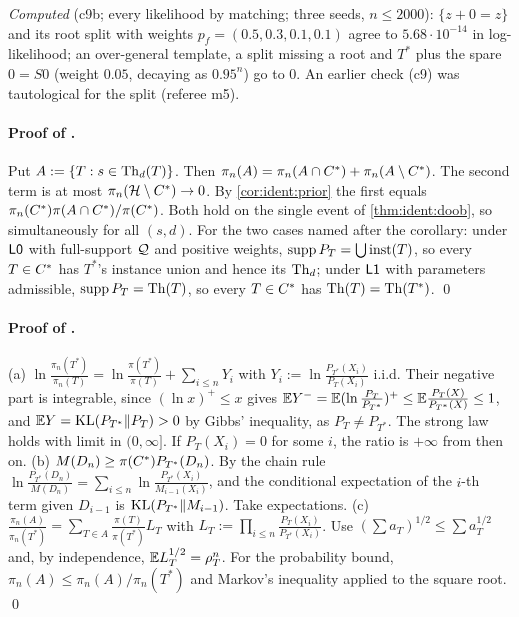 \emph{Computed} (c9b; every likelihood by matching; three seeds, $n\le2000$): $\{z+0=z\}$ and its root split with weights $p_f=(0.5,0.3,0.1,0.1)$ agree to $5.68\cdot10^{-14}$ in log-likelihood; an over-general template, a split missing a root and $T^*$ plus the spare $0=S0$ (weight $0.05$, decaying as $0.95^n$) go to $0$. An earlier check (c9) was tautological for the split (referee m5).

\paragraph{Proof of .} Put $A:=\{T:s\in\mathrm{Th}_d(T)\}$. Then $\pi_n(A)=\pi_n(A\cap C^{*})+\pi_n(A\setminus C^{*})$. The second term is at most $\pi_n(\mathcal{H}\setminus C^{*})\to0$. By \cref{cor:ident:prior} the first equals $\pi_n(C^{*})\pi(A\cap C^{*})/\pi(C^{*})$. Both hold on the single event of \cref{thm:ident:doob}, so simultaneously for all $(s,d)$. For the two cases named after the corollary: under $\mathord{\mathsf{L0}}$ with full-support $\mathcal{Q}$ and positive weights, $\operatorname{supp}P_T=\bigcup\mathrm{inst}(T)$, so every $T\in C^{*}$ has $T^*$'s instance union and hence its $\mathrm{Th}_d$; under $\mathord{\mathsf{L1}}$ with parameters admissible, $\operatorname{supp}P_T=\mathrm{Th}(T)$, so every $T\in C^{*}$ has $\mathrm{Th}(T)=\mathrm{Th}(T^*)$. \qed

\paragraph{Proof of .}
(a) $\ln\frac{\pi_n(T^*)}{\pi_n(T)}=\ln\frac{\pi(T^*)}{\pi(T)}+\sum_{i\le n}Y_i$ with $Y_i:=\ln\frac{P_{T^*}(X_i)}{P_T(X_i)}$ i.i.d. Their negative part is integrable, since $(\ln x)^+\le x$ gives $\mathbb{E} Y^-=\mathbb{E}(\ln\frac{P_T}{P_{T^*}})^+\le\mathbb{E}\frac{P_T(X)}{P_{T^*}(X)}\le1$, and $\mathbb{E} Y=\mathrm{KL}(P_{T^*}\|P_T)>0$ by Gibbs' inequality, as $P_T\ne P_{T^*}$. The strong law holds with limit in $(0,\infty]$. If $P_T(X_i)=0$ for some $i$, the ratio is $+\infty$ from then on.
(b) $M(D_n)\ge\pi(C^{*})P_{T^*}(D_n)$. By the chain rule $\ln\frac{P_{T^*}(D_n)}{M(D_n)}=\sum_{i\le n}\ln\frac{P_{T^*}(X_i)}{M_{i-1}(X_i)}$, and the conditional expectation of the $i$-th term given $D_{i-1}$ is $\mathrm{KL}(P_{T^*}\|M_{i-1})$. Take expectations.
(c) $\frac{\pi_n(A)}{\pi_n(T^*)}=\sum_{T\in A}\frac{\pi(T)}{\pi(T^*)}L_T$ with $L_T:=\prod_{i\le n}\frac{P_T(X_i)}{P_{T^*}(X_i)}$. Use $(\sum a_T)^{1/2}\le\sum a_T^{1/2}$ and, by independence, $\mathbb{E} L_T^{1/2}=\rho_T^n$. For the probability bound, $\pi_n(A)\le\pi_n(A)/\pi_n(T^*)$ and Markov's inequality applied to the square root. \qed

